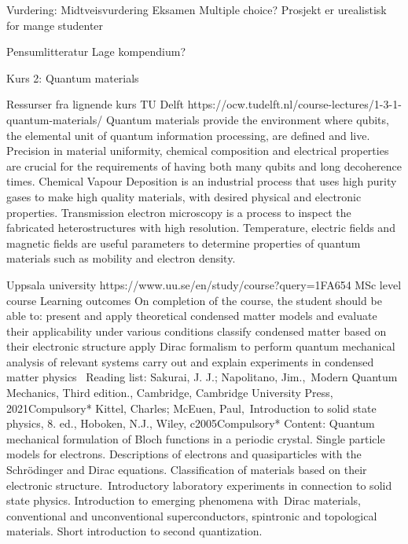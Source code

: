 \documentclass[%
oneside,                 %
final,                   %
10pt]{article}
\begin{document}
Vurdering: 
Midtveisvurdering 
Eksamen
Multiple choice? 
Prosjekt er urealistisk for mange studenter 

Pensumlitteratur  
Lage kompendium? 

Kurs 2: Quantum materials 

Ressurser fra lignende kurs
TU Delft 
https://ocw.tudelft.nl/course-lectures/1-3-1-quantum-materials/ 
Quantum materials provide the environment where qubits, the elemental unit of quantum information processing, are defined and live.
Precision in material uniformity, chemical composition and electrical properties are crucial for the requirements of having both many qubits and long decoherence times.
Chemical Vapour Deposition is an industrial process that uses high purity gases to make high quality materials, with desired physical and electronic properties.
Transmission electron microscopy is a process to inspect the fabricated heterostructures with high resolution.
Temperature, electric fields and magnetic fields are useful parameters to determine properties of quantum materials such as mobility and electron density.

Uppsala university 
https://www.uu.se/en/study/course?query=1FA654 
MSc level course 
Learning outcomes
On completion of the course, the student should be able to:
present and apply theoretical condensed matter models and evaluate their applicability under various conditions
classify condensed matter based on their electronic structure
apply Dirac formalism to perform quantum mechanical analysis of relevant systems
carry out and explain experiments in condensed matter physics 
Reading list: 
Sakurai, J. J.; Napolitano, Jim., Modern Quantum Mechanics, Third edition., Cambridge, Cambridge University Press, 2021Compulsory*
Kittel, Charles; McEuen, Paul, Introduction to solid state physics, 8. ed., Hoboken, N.J., Wiley, c2005Compulsory*
Content: 
Quantum mechanical formulation of Bloch functions in a periodic crystal. Single particle models for electrons. Descriptions of electrons and quasiparticles with the Schrödinger and Dirac equations. Classification of materials based on their electronic structure. Introductory laboratory experiments in connection to solid state physics. Introduction to emerging phenomena with Dirac materials, conventional and unconventional superconductors, spintronic and topological materials. Short introduction to second quantization.
\end{document}
